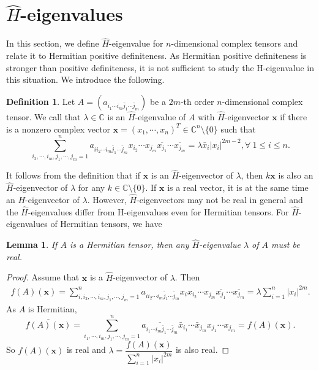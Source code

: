 \documentclass[10pt,reqno]{amsart}
\newtheorem{lem}[thm]{Lemma}
\theoremstyle{definition}
\newtheorem{defn}[thm]{Definition}
\begin{document}
\section{$\hat{H}$-eigenvalues}
In this section, we define $\hat{H}$-eigenvalue for $n$-dimensional complex tensors and relate it to Hermitian positive definiteness. As Hermitian positive definiteness is stronger than positive definiteness, it is not sufficient to study the H-eigenvalue in this situation. We introduce the following.
\begin{defn}
		Let $A=(a_{i_1\cdots i_m\bar{j}_1\cdots \bar{j}_m})$ be a $2m$-th order $n$-dimensional complex tensor. We call that $\lambda\in \mathbb C$ is an $\hat{H}$-eigenvalue of $A$ with $\hat{H}$-eigenvector $\mathbf{x}$ if there is a nonzero complex vector $\mathbf{x}=(x_1,\cdots, x_n)^T\in \mathbb C^n\setminus \{0\}$ such that 
$$\sum_{i_2,\cdots, i_m, j_1, \cdots, j_m=1}^n a_{ii_2\cdots i_m\bar{j}_1\cdots \bar{j}_m} x_{i_2}\cdots x_{j_m}\overline{x_{j_1}}\cdots\overline{x_{j_m}}=\lambda \bar{x}_{i}|x_{i}|^{2m-2}, {\forall}\  1\leq i\leq n.$$ 
	\end{defn}
It follows from the definition that if $\mathbf{x}$ is an $\hat{H}$-eigenvector of $\lambda$, then $k\mathbf{x}$ is also an $\hat{H}$-eigenvector of $\lambda$ for any $k\in \mathbb C\setminus \{0\}$. If $\mathbf{x}$ is a real vector, it is at the same time an $H$-eigenvector of $\lambda$. However, $\hat{H}$-eigenvectors may not be real in general and the $\hat{H}$-eigenvalues differ from H-eigenvalues even for Hermitian tensors. For $\hat{H}$-eigenvalues of Hermitian tensors, we have
\begin{lem}
If $A$ is a Hermitian tensor, then any $\hat{H}$-eigenvalue $\lambda$ of $A$ must be real.
\end{lem}
\begin{proof}
Assume that $\mathbf{x}$ is a $\hat{H}$-eigenvector of $\lambda$. Then 
\begin{align*}
		f(A)(\mathbf x)=\sum_{i, i_2,\cdots, i_m, j_1, \cdots, j_m=1}^n a_{ii_2\cdots i_m\bar{j}_1\cdots \bar{j}_m} x_i x_{i_2}\cdots x_{j_m}\overline{x_{j_1}}\cdots\overline{x_{j_m}}=\lambda\sum_{i=1}^n |x_{i}|^{2m}.\end{align*} 
	As $A$ is Hermitian,
	 $$\overline{f(A)(\mathbf x)}=\sum_{i_1,\cdots, i_m, j_1, \cdots, j_m=1}^n \overline{a_{i_1\cdots i_m\bar{j}_1\cdots \bar{j}_m}} \bar{x}_{i_1}\cdots \bar{x}_{j_m}{x_{j_1}}\cdots{x_{j_m}}=f(A)(\mathbf x).$$ So $f(A)(\mathbf x)$ is real and $\lambda=\dfrac{f(A)(\mathbf x)}{\sum_{i=1}^n|x_i|^{2m}}$ is also real.
	\end{proof}
\end{document}
